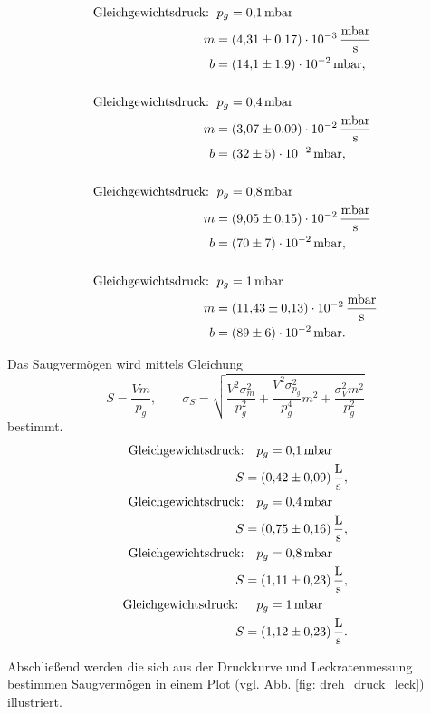 \begin{align*}
  \text{Gleichgewichtsdruck: } &\, p_g=\SI{0.1}{\milli\bar} \\
  m&= \SI{4.31\pm 0.17 e-3 }{\milli\bar\per\second}\\
  b&=\SI{14.1\pm1.9 e-2}{\milli\bar},\\
  \\
  \text{Gleichgewichtsdruck: } &\, p_g=\SI{0.4}{\milli\bar} \\
  m&= \SI{3.07\pm 0.09 e-2 }{\milli\bar\per\second}\\
  b&=\SI{32\pm5 e-2}{\milli\bar},\\
  \\
  \text{Gleichgewichtsdruck: } &\, p_g=\SI{0.8}{\milli\bar}\\
  m&= \SI{9.05\pm 0.15 e-2 }{\milli\bar\per\second}\\
  b&=\SI{70\pm7 e-2}{\milli\bar},\\
  \\
  \text{Gleichgewichtsdruck: } &\, p_g=\SI{1}{\milli\bar}\\
  m&= \SI{11.43\pm 0.13 e-2 }{\milli\bar\per\second}\\
  b&=\SI{89\pm 6 e-2}{\milli\bar}.
\end{align*}

Das Saugvermögen wird mittels Gleichung
\begin{equation}
  \label{eq:saug_leck}
  S=\frac{Vm}{p_g}, \qquad \sigma_{S}=\sqrt{\frac{V^{2} \sigma_{m}^{2}}{p_{g}^{2}} + \frac{V^{2} \sigma_{p_{g}}^{2}}{p_{g}^{4}} m^{2} + \frac{\sigma_{V}^{2} m^{2}}{p_{g}^{2}}}
\end{equation}
bestimmt.
\begin{align*}
  \text{Gleichgewichtsdruck:} &\quad p_g=\SI{0.1}{\milli\bar} \\
  S&=\SI{0.42\pm 0.09}{\litre\per\second},
  \\
  \text{Gleichgewichtsdruck:} &\quad p_g=\SI{0.4}{\milli\bar} \\
  S&=\SI{0.75\pm 0.16}{\litre\per\second},
  \\
  \text{Gleichgewichtsdruck:} &\quad p_g=\SI{0.8}{\milli\bar}\\
  S&=\SI{1.11\pm 0.23}{\litre\per\second},
  \\
  \text{Gleichgewichtsdruck: } &\quad p_g=\SI{1}{\milli\bar}\\
  S&=\SI{1.12\pm 0.23}{\litre\per\second}.
\end{align*}

Abschließend werden die sich aus der Druckkurve und Leckratenmessung bestimmen %
Saugvermögen in einem Plot (vgl. Abb. \ref{fig: dreh_druck_leck}) illustriert.

